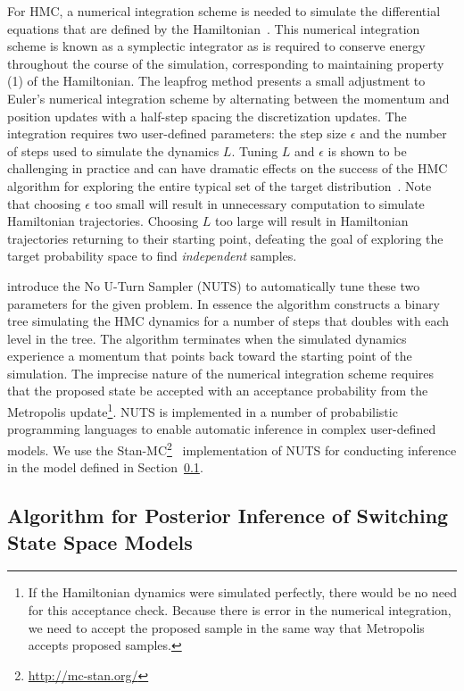 For HMC, a numerical integration scheme is needed to simulate the differential equations that are defined by the Hamiltonian~\citep{neal2011mcmc}. This numerical integration scheme is known as a symplectic integrator as is required to conserve energy throughout the course of the simulation, corresponding to maintaining property (1) of the Hamiltonian. The leapfrog method presents a small adjustment to Euler's numerical integration scheme by alternating between the momentum and position updates with a half-step spacing the discretization updates. The integration requires two user-defined parameters: the step size $\epsilon$ and the number of steps used to simulate the dynamics $L$. Tuning $L$ and $\epsilon$ is shown to be challenging in practice and can have dramatic effects on the success of the HMC algorithm for exploring the entire typical set of the target distribution~\citep{hoffman2014no}. Note that choosing $\epsilon$ too small will result in unnecessary computation to simulate Hamiltonian trajectories. Choosing $L$ too large will result in Hamiltonian trajectories returning to their starting point, defeating the goal of exploring the target probability space to find \textit{independent} samples.

\cite{hoffman2014no} introduce the No U-Turn Sampler (NUTS) to automatically tune these two parameters for the given problem. In essence the algorithm constructs a binary tree simulating the HMC dynamics for a number of steps that doubles with each level in the tree. The algorithm terminates when the simulated dynamics experience a momentum that points back toward the starting point of the simulation. The imprecise nature of the numerical integration scheme requires that the proposed state be accepted with an acceptance probability from the Metropolis update\footnote{If the Hamiltonian dynamics were simulated perfectly, there would be no need for this acceptance check. Because there is error in the numerical integration, we need to accept the proposed sample in the same way that Metropolis accepts proposed samples.}. NUTS is implemented in a number of probabilistic programming languages to enable automatic inference in complex user-defined models. We use the Stan-MC\footnote{\url{http://mc-stan.org/}}~\citep{carpenter2016stan} implementation of NUTS for conducting inference in the model defined in Section~\ref{sec:posterior_inference_sssm}.

\subsection{Algorithm for Posterior Inference of Switching State Space Models}\label{sec:posterior_inference_sssm}

